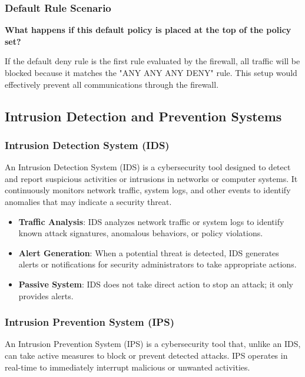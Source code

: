 \subsubsection{Default Rule Scenario}

\textbf{What happens if this default policy is placed at the top of the policy set?}

If the default deny rule is the first rule evaluated by the firewall, all traffic will be blocked because it matches the "ANY ANY ANY DENY" rule. This setup would effectively prevent all communications through the firewall.


\subsection{Intrusion Detection and Prevention Systems}

\subsubsection{Intrusion Detection System (IDS)}

An Intrusion Detection System (IDS) is a cybersecurity tool designed to detect and report suspicious activities or intrusions in networks or computer systems. It continuously monitors network traffic, system logs, and other events to identify anomalies that may indicate a security threat.

\begin{itemize}
    \item \textbf{Traffic Analysis}: IDS analyzes network traffic or system logs to identify known attack signatures, anomalous behaviors, or policy violations.
    \item \textbf{Alert Generation}: When a potential threat is detected, IDS generates alerts or notifications for security administrators to take appropriate actions.
    \item \textbf{Passive System}: IDS does not take direct action to stop an attack; it only provides alerts.
\end{itemize}

\subsubsection{Intrusion Prevention System (IPS)}

An Intrusion Prevention System (IPS) is a cybersecurity tool that, unlike an IDS, can take active measures to block or prevent detected attacks. IPS operates in real-time to immediately interrupt malicious or unwanted activities.


